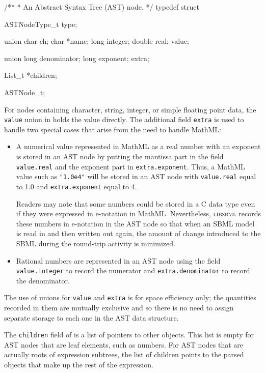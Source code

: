 \documentclass{sbmlmanual}
\newcommand{\libsbml}{\textsc{libsbml}}
\begin{document}
\begin{example}[c]
/**
 * An Abstract Syntax Tree (AST) node.
 */
typedef struct
{
  ASTNodeType_t type;

  union
  {
    char   ch;
    char   *name;
    long   integer;
    double real;
  } value;    

  union
  {
    long denominator;
    long exponent;
  } extra;

  List_t *children;
} ASTNode_t;
\end{example}

For nodes containing character, string, integer, or simple floating point
data, the \texttt{value} union in  holds the value
directly.  The additional field \texttt{extra} is used to handle two
special cases that arise from the need to handle MathML:

\begin{itemize}
  
\item A numerical value represented in MathML as a real number with an
  exponent is stored in an AST node by putting the mantissa part in the
  field \texttt{value.real} and the exponent part in
  \texttt{extra.exponent}.  Thus, a MathML value such as \texttt{"1.0e4"}
  will be stored in an AST node with \texttt{value.real} equal to 1.0 and
  \texttt{extra.exponent} equal to 4.
  
  Readers may note that some numbers could be stored in a C 
  data type even if they were expressed in e-notation in MathML.
  Nevertheless, \libsbml{} records these numbers in e-notation in the AST
  node so that when an SBML model is read in and then written out again,
  the amount of change introduced to the SBML during the round-trip
  activity is minimized.

\item Rational numbers are represented in an AST node using the field
  \texttt{value.integer} to record the numerator and
  \texttt{extra.denominator} to record the denominator.

\end{itemize}

The use of unions for \texttt{value} and \texttt{extra} is for space
efficiency only; the quantities recorded in them are mutually exclusive and
so there is no need to assign separate storage to each one in the AST data
structure.

The \texttt{children} field of  is a list of pointers to
other  objects.  This list is empty for AST nodes that
are leaf elements, such as numbers.  For AST nodes that are actually roots
of expression subtrees, the list of children points to the parsed objects
that make up the rest of the expression.
\end{document}
